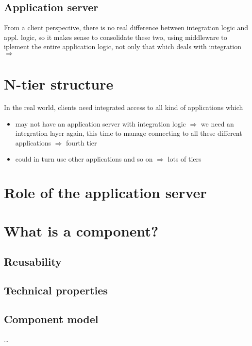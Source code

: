 		\subsection{Application server}
			From a client perspective, there is no real difference between integration logic and appl. logic, so it makes sense to consolidate these two, using middleware to iplement the entire application logic, not only that which deals with integration $\Rightarrow $ \textbf{}
		
	\pagebreak %
		
	\section{N-tier structure}
		In the real world,  clients need integrated access to all kind of applications which
		\begin{itemize}
			\item may not have an application server with integration logic $ \Rightarrow $ we need an integration layer again, this time to manage connecting to all these different applications $ \Rightarrow $ fourth tier
			\item could in turn use other applications and so on $ \Rightarrow $ lots of tiers
		\end{itemize}
		
		
		
		
		
	\section{Role of the application server}
		
		
	\section{What is a component?}
		\subsection{Reusability}
		
		\subsection{Technical properties}
			
		\subsection{Component model}
			\ldots\\\\
	
